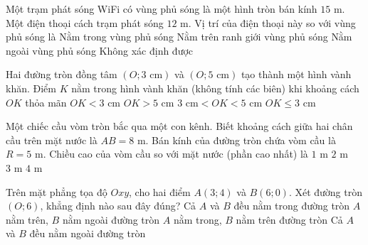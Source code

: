 \begin{ex}%
	Một trạm phát sóng WiFi có vùng phủ sóng là một hình tròn bán kính $15\text{ m}$. Một điện thoại cách trạm phát sóng $12\text{ m}$. Vị trí của điện thoại này so với vùng phủ sóng là
	\choice
	{\True Nằm trong vùng phủ sóng}
	{Nằm trên ranh giới vùng phủ sóng}
	{Nằm ngoài vùng phủ sóng}
	{Không xác định được}
\end{ex}

\begin{ex}%
	Hai đường tròn đồng tâm $(O; 3\text{ cm})$ và $(O; 5\text{ cm})$ tạo thành một hình vành khăn. Điểm $K$ nằm trong hình vành khăn (không tính các biên) khi khoảng cách $OK$ thỏa mãn
	\choice
	{$OK < 3\text{ cm}$}
	{$OK > 5\text{ cm}$}
	{\True $3\text{ cm} < OK < 5\text{ cm}$}
	{$OK \le 3\text{ cm}$}
\end{ex}

\begin{ex}%
	Một chiếc cầu vòm tròn bắc qua một con kênh. Biết khoảng cách giữa hai chân cầu trên mặt nước là $AB = 8\text{ m}$. Bán kính của đường tròn chứa vòm cầu là $R = 5\text{ m}$. Chiều cao của vòm cầu so với mặt nước (phần cao nhất) là
	\choice
	{$1\text{ m}$}
	{\True $2\text{ m}$}
	{$3\text{ m}$}
	{$4\text{ m}$}
\end{ex}

\begin{ex}%
	Trên mặt phẳng tọa độ $Oxy$, cho hai điểm $A(3; 4)$ và $B(6; 0)$. Xét đường tròn $(O; 6)$, khẳng định nào sau đây đúng?
	\choice
	{Cả $A$ và $B$ đều nằm trong đường tròn}
	{$A$ nằm trên, $B$ nằm ngoài đường tròn}
	{\True $A$ nằm trong, $B$ nằm trên đường tròn}
	{Cả $A$ và $B$ đều nằm ngoài đường tròn}
\end{ex}

